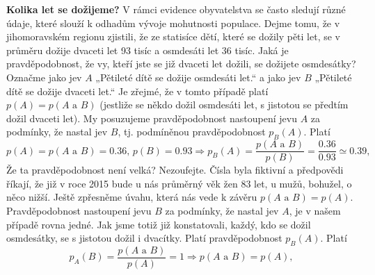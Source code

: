 \wikitextrule
\begin{example}\label{mai:exam059}
  \textbf{Kolika let se dožijeme?}\newline\small
  V rámci evidence obyvatelstva se často sledují různé údaje, které slouží k odhadům vývoje 
  mohutnosti populace. Dejme tomu, že v jihomoravském regionu zjistili, že ze statisíce dětí, které 
  se dožily pěti let, se v průměru dožije dvaceti let \num{93} tisíc a osmdesáti let \num{36} 
  tisíc. Jaká je pravděpodobnost, že vy, kteří jste se již dvaceti let dožili, se dožijete 
  osmdesátky? Označme jako jev \(A\) „Pětileté dítě se dožije osmdesáti let.“ a jako jev \(B\) 
  „Pětileté dítě se dožije dvaceti let.“ Je zřejmé, že v tomto případě platí \(p(A) = p(A\text{ a 
  }B)\) (jestliže se někdo dožil osmdesáti let, s jistotou se předtím dožil dvaceti let). My 
  posuzujeme pravděpodobnost nastoupení jevu \(A\) za podmínky, že nastal jev \(B\), tj. podmíněnou 
  pravděpodobnost \(p_B(A)\). Platí
  \begin{equation*}
    p(A)   = p(A\text{ a }B) = \num{0.36},\, p(B) = \num{0.93}\Rightarrow 
    p_B(A) = \dfrac{p(A\text{ a }B)}{p(B)} = \dfrac{\num{0.36}}{\num{0.93}} \simeq \num{0.39},
  \end{equation*}
  Že ta pravděpodobnost není velká? Nezoufejte. Čísla byla fiktivní a předpovědi říkají, že již v 
  roce \num{2015} bude u nás průměrný věk žen \num{83} let, u mužů, bohužel, o něco nižší. Ještě 
  zpřesněme úvahu, která nás vede k závěru \(p(A\text{ a }B) = p(A)\). Pravděpodobnost nastoupení 
  jevu \(B\) za podmínky, že nastal jev \(A\), je v našem případě rovna jedné. Jak jsme totiž již 
  konstatovali, každý, kdo se dožil osmdesátky, se s jistotou dožil i dvacítky. Platí
  pravděpodobnost \(p_B(A)\). Platí
  \begin{equation*}
    p_A(B) = \dfrac{p(A\text{ a }B)}{p(A)} = 1 \Rightarrow p(A\text{ a }B) = p(A),
  \end{equation*}
\normalsize
\end{example}